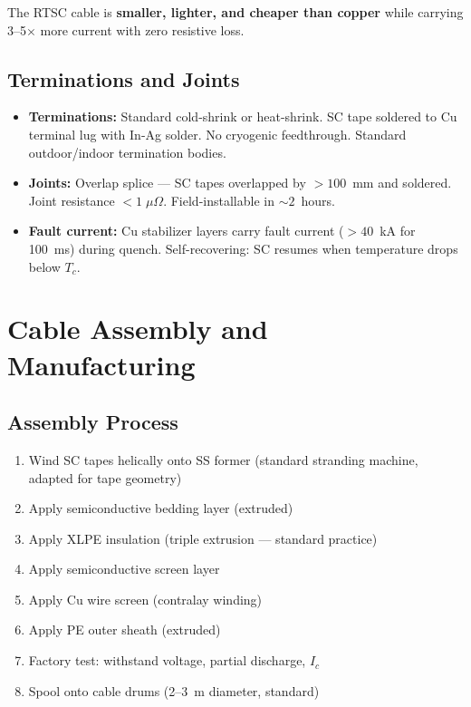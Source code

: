 \documentclass[11pt, a4paper]{article}
\begin{document}
The RTSC cable is \textbf{smaller, lighter, and cheaper than copper}
while carrying 3--5$\times$ more current with zero resistive loss.

\subsection{Terminations and Joints}

\begin{itemize}[nosep]
  \item \textbf{Terminations:} Standard cold-shrink or heat-shrink.
        SC tape soldered to Cu terminal lug with In-Ag solder.
        No cryogenic feedthrough. Standard outdoor/indoor termination
        bodies.
  \item \textbf{Joints:} Overlap splice --- SC tapes overlapped by
        $> 100$~mm and soldered. Joint resistance
        $< 1\;\mu\Omega$. Field-installable in $\sim 2$~hours.
  \item \textbf{Fault current:} Cu stabilizer layers carry fault
        current ($> 40$~kA for 100~ms) during quench.
        Self-recovering: SC resumes when temperature drops below
        $T_c$.
\end{itemize}

\section{Cable Assembly and Manufacturing}
\label{sec:cable-mfg}

\subsection{Assembly Process}

\begin{enumerate}[nosep]
  \item Wind SC tapes helically onto SS former (standard stranding
        machine, adapted for tape geometry)
  \item Apply semiconductive bedding layer (extruded)
  \item Apply XLPE insulation (triple extrusion --- standard practice)
  \item Apply semiconductive screen layer
  \item Apply Cu wire screen (contralay winding)
  \item Apply PE outer sheath (extruded)
  \item Factory test: withstand voltage, partial discharge, $I_c$
  \item Spool onto cable drums (2--3~m diameter, standard)
\end{enumerate}
\end{document}
